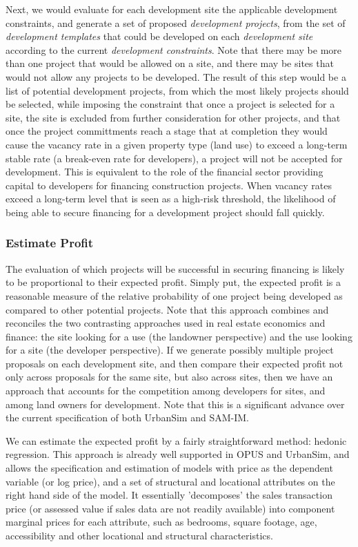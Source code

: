 Next, we would evaluate for each development site the applicable development constraints, and
generate a set of proposed \emph{development projects}, from the set of \emph{development templates}
that could be developed on each \emph{development site} according to the current \emph{development
constraints}.  Note that there may be more than one project that would be allowed on a site, and
there may be sites that would not allow any projects to be developed.  The result of this step
would be a list of potential development projects, from which the most likely projects should be
selected, while imposing the constraint that once a project is selected for a site, the site is
excluded from further consideration for other projects, and that once the project committments
reach a stage that at completion they would cause the vacancy rate in a given property type (land
use) to exceed a long-term stable rate (a break-even rate for developers), a project will not be
accepted for development.  This is equivalent to the role of the financial sector providing
capital to developers for financing construction projects. When vacancy rates exceed a long-term
level that is seen as a high-risk threshold, the likelihood of being able to secure financing for
a development project should fall quickly.

\subsubsection{Estimate Profit}
The evaluation of which projects will be successful in securing financing is likely to be proportional
to their expected profit.  Simply put, the expected profit is a reasonable measure of the relative
probability of one project being developed as compared to other potential projects.  Note that this
approach combines and reconciles the two contrasting approaches used in real estate economics and
finance: the site looking for a use (the landowner perspective) and the use looking for a site (the developer perspective).  If we generate possibly multiple project proposals on each development site,
and then compare their expected profit not only across proposals for the same site, but also across
sites, then we have an approach that accounts for the competition among developers for sites, and
among land owners for development.  Note that this is a significant advance over the current
specification of both UrbanSim and SAM-IM.

We can estimate the expected profit by a fairly straightforward method: hedonic regression.  This
approach is already well supported in OPUS and UrbanSim, and allows the specification and estimation
of models with price as the dependent variable (or log price), and a set of structural and locational
attributes on the right hand side of the model.  It essentially 'decomposes' the sales transaction
price (or assessed value if sales data are not readily available) into component marginal prices for
each attribute, such as bedrooms, square footage, age, accessibility and other locational
and structural characteristics.

